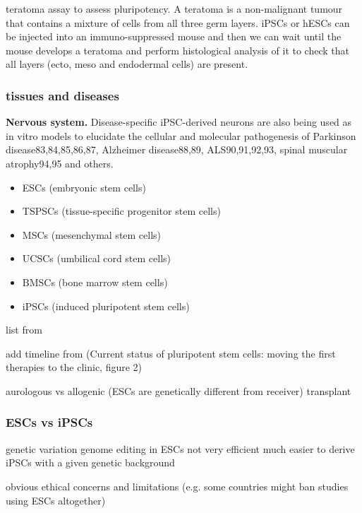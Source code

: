 teratoma assay to assess pluripotency.
A teratoma is a non-malignant tumour that contains a mixture of cells from all three germ layers.
iPSCs or hESCs can be injected into an immuno-suppressed mouse and then we can wait until the mouse develops a teratoma and perform histological analysis of it to check that all layers (ecto, meso and endodermal cells) are present.




\subsubsection{tissues and diseases}

\textbf{Nervous system.}
Disease-specific iPSC-derived neurons are also being used as in vitro models to elucidate the cellular and molecular pathogenesis of Parkinson disease83,84,85,86,87, Alzheimer disease88,89, ALS90,91,92,93, spinal muscular atrophy94,95 and others.


\begin{itemize}
    \item ESCs (embryonic stem cells)
    \item TSPSCs (tissue-specific progenitor stem cells)
    \item MSCs (mesenchymal stem cells)
    \item UCSCs (umbilical cord stem cells)
    \item BMSCs (bone marrow stem cells)
    \item iPSCs (induced pluripotent stem cells)
\end{itemize}

list from \cite{mahla2016stem}


add timeline from (Current status of pluripotent stem cells: moving the first therapies to the clinic,  figure 2)

\cite{kimbrel2015current}

aurologous vs allogenic (ESCs are genetically different from receiver) transplant

\subsubsection{ESCs vs iPSCs}

genetic variation
genome editing in ESCs not very efficient
much easier to derive iPSCs with a given genetic background

obvious ethical concerns and limitations (e.g. some countries might ban studies using ESCs altogether)

